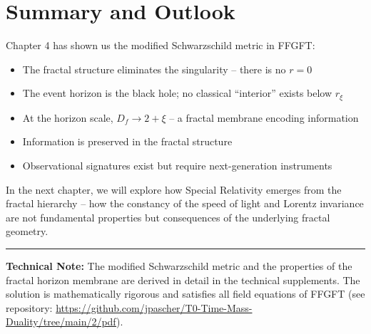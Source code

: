 \section{Summary and Outlook}

Chapter 4 has shown us the modified Schwarzschild metric in FFGFT:

\begin{itemize}[leftmargin=*]
\item The fractal structure eliminates the singularity -- there is no $r = 0$
\item The event horizon is the black hole; no classical ``interior'' exists below $r_\xi$
\item At the horizon scale, $D_f \to 2 + \xi$ -- a fractal membrane encoding information
\item Information is preserved in the fractal structure
\item Observational signatures exist but require next-generation instruments
\end{itemize}

In the next chapter, we will explore how Special Relativity emerges from the fractal hierarchy -- how the constancy of the speed of light and Lorentz invariance are not fundamental properties but consequences of the underlying fractal geometry.

\vspace{1cm}
\hrule
\vspace{0.5cm}
\noindent\textbf{Technical Note:} The modified Schwarzschild metric and the properties of the fractal horizon membrane are derived in detail in the technical supplements. The solution is mathematically rigorous and satisfies all field equations of FFGFT (see repository: \url{https://github.com/jpascher/T0-Time-Mass-Duality/tree/main/2/pdf}).




